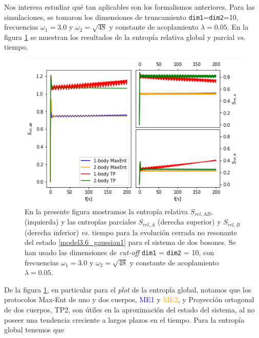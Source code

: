 \documentclass{report} %
\numberwithin{equation}{section}
\begin{document}
Nos interesa estudiar qué tan aplicables son los formalismos anteriores. Para las simulaciones, se tomaron los dimensiones de truncamiento \texttt{dim1}=\texttt{dim2}=10, frecuencias $\omega_1 = 3.0$ y $\omega_2 = \sqrt{48}$ y constante de acoplamiento $\lambda = 0.05$. En la figura \ref{rel_entropy_closed_nonres.png} se muestran los resultados de la entropía relativa global y parcial \textit{vs.} tiempo. 

\begin{figure}
    \centering
    \includegraphics[scale=0.60]{figs/section3_4/section5_bxb-closed-nonres/rel_entropy_closed_nonres_g.png}
    \caption{En la presente figura mostramos la entropía relativa $S_{rel,AB}$, (izquierda) y las entropías parciales $S_{rel,A}$ (derecha superior) y $S_{rel,B}$ (derecha inferior) \textit{vs.} tiempo para la evolución cerrada no resonante del estado \eqref{model3.6_gaussian1} para el sistema de dos bosones. Se han usado las dimensiones de \textit{cut-off} \texttt{dim1} = \texttt{dim2} = 10, con frecuencias $\omega_1 = 3.0$ y $\omega_2 =\sqrt{48}$ y constante de acoplamiento $\lambda = 0.05$.}
    \label{rel_entropy_closed_nonres.png}
\end{figure}

De la figura \ref{rel_entropy_closed_nonres.png}, en particular para el \textit{plot} de la entropía global, notamos que los protocolos Max-Ent de uno y dos cuerpos, \textcolor{blue}{ME1} y \textcolor{orange}{ME2}, y Proyección ortogonal de dos  cuerpos, \textcolor{dark green}{TP2}, son útiles en la aproximación del estado del sistema, al no poseer una tendencia creciente a largos plazos en el tiempo. Para la entropía global tenemos que
\end{document}
